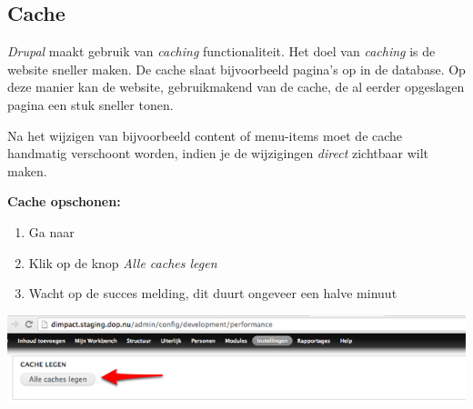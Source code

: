 \subsection{Cache}\label{cache}
\emph{Drupal} maakt gebruik van \emph{caching} functionaliteit. Het doel van \emph{caching} is de website sneller maken. De cache slaat bijvoorbeeld pagina's op in de database. Op deze manier kan de website, gebruikmakend van de cache, de al eerder opgeslagen pagina een stuk sneller tonen. 

Na het wijzigen van bijvoorbeeld content of menu-items moet de cache handmatig verschoont worden, indien je de wijzigingen \emph{direct} zichtbaar wilt maken. 

\textbf{Cache opschonen:}

\begin{enumerate}
\item Ga naar  
\item Klik op de knop \emph{Alle caches legen}
\item Wacht op de succes melding, dit duurt ongeveer een halve minuut
\end{enumerate}

\begin{center}
	\includegraphics[width=\textwidth]{img/cache.png}
\end{center}